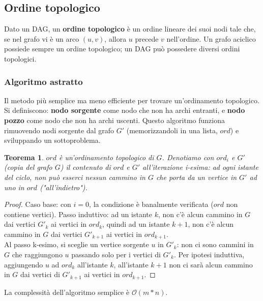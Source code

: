 \documentclass[11pt]{article}
\newtheorem*{theorem}{Teorema}
\theoremstyle{proprietà}
\begin{document}
\subsection{Ordine topologico}
Dato un DAG, un \textbf{ordine topologico} è un ordine lineare dei suoi nodi tale che, se nel grafo vi è un arco $(u,v)$, 
allora $u$ precede $v$ nell'ordine. Un grafo aciclico possiede sempre un ordine topologico; un DAG può possedere diversi 
ordini topologici.
\subsubsection{Algoritmo astratto}
Il metodo più semplice ma meno efficiente per trovare un'ordinamento topologico. Si definiscono: \textbf{nodo sorgente} 
come nodo che non ha archi entranti, e \textbf{nodo pozzo} come nodo che non ha archi uscenti. Questo algoritmo funziona
rimuovendo nodi sorgente dal grafo $G'$ (memorizzandoli in una lista, $ord$) e sviluppando un sottoproblema.
\begin{theorem}
    $ord$ è un'ordinamento topologico di $G$. Denotiamo con $ord_i$ e $G'$ (copia del grafo $G$) il contenuto di $ord$ e
    $G'$ all'iterazione i-esima: ad ogni istante del ciclo, non può esserci nessun cammino in $G$ che porta da un vertice 
    in $G'$ ad uno in $ord$ ("all'indietro").
\end{theorem}
\begin{proof}
    Caso base: con $i=0$, la condizione è banalmente verificata ($ord$ non contiene vertici).
    Passo induttivo: ad un istante $k$, non c'è alcun cammino in $G$ dai vertici $G'_k$ ai vertici in $ord_k$, quindi 
    ad un istante $k+1$, non c'è alcun cammino in $G$ dai vertici $G'_{k+1}$ ai vertici in $ord_{k+1}$.\\
    Al passo k-esimo, si sceglie un vertice sorgente $u$ in $G'_k$: non ci sono cammini in $G$ che raggiungono $u$ passando solo 
    per i vertici di $G'_k$. Per ipotesi induttiva, aggiungendo $u$ ad $ord_k$ all'istante $k$, all'istante $k+1$ non ci 
    sarà alcun cammino in $G$ dai vertici di $G'_{k+1}$ ai vertici in $ord_{k+1}$.
\end{proof}
La complessità dell'algoritmo semplice è $\mathcal{O}(m*n)$.
\end{document}
